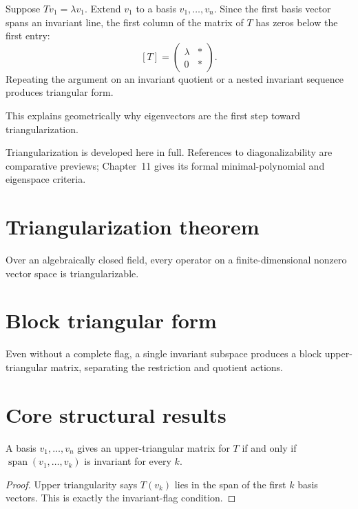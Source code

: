 \begin{example}\label{ex:i10-expand-02}
Suppose \(Tv_1=\lambda v_1\). Extend \(v_1\) to a basis
\(v_1,\ldots,v_n\). Since the first basis vector spans an invariant line, the
first column of the matrix of \(T\) has zeros below the first entry:
\[
[T]=\begin{pmatrix}
\lambda&*\\
0&*
\end{pmatrix}.
\]
Repeating the argument on an invariant quotient or a nested invariant sequence
produces triangular form.

This explains geometrically why eigenvectors are the first step toward
triangularization.
\end{example}
\begin{remark}
Triangularization is developed here in full. References to diagonalizability
are comparative previews; Chapter~11 gives its formal minimal-polynomial and
eigenspace criteria.
\end{remark}

\section{Triangularization theorem}
Over an algebraically closed field, every operator on a finite-dimensional nonzero vector space is triangularizable.

\section{Block triangular form}
Even without a complete flag, a single invariant subspace produces a block upper-triangular matrix, separating the restriction and quotient actions.

\section{Core structural results}

\begin{theorem}\label{thm:i10-01}
A basis $v_1,\ldots,v_n$ gives an upper-triangular matrix for $T$ if and only if $\operatorname{span}(v_1,\ldots,v_k)$ is invariant for every $k$.
\begin{proof}
Upper triangularity says $T(v_k)$ lies in the span of the first $k$ basis vectors. This is exactly the invariant-flag condition.
\end{proof}
\end{theorem}


